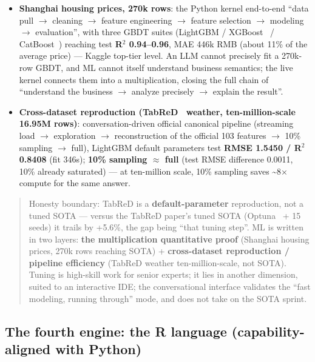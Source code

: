 \documentclass[11pt]{article}
\begin{document}
\begin{itemize}
\item
  \textbf{Shanghai housing prices, 270k rows}: the Python kernel end-to-end ``data pull $\rightarrow$ cleaning $\rightarrow$ feature engineering $\rightarrow$ feature selection $\rightarrow$ modeling $\rightarrow$ evaluation'', with three GBDT suites (LightGBM / XGBoost~\cite{xgboost} / CatBoost~\cite{catboost}) reaching test \textbf{R$^2$ 0.94--0.96}, MAE 446k RMB (about 11\% of the average price) --- Kaggle top-tier level. An LLM cannot precisely fit a 270k-row GBDT, and ML cannot itself understand business semantics; the live kernel connects them into a multiplication, closing the full chain of ``understand the business $\rightarrow$ analyze precisely $\rightarrow$ explain the result''.
\item
  \textbf{Cross-dataset reproduction (TabReD~\cite{tabred} weather, ten-million-scale 16.95M rows)}: conversation-driven official canonical pipeline (streaming load $\rightarrow$ exploration $\rightarrow$ reconstruction of the official 103 features $\rightarrow$ 10\% sampling $\rightarrow$ full), LightGBM default parameters test \textbf{RMSE 1.5450 / R$^2$ 0.8408} (fit 346s); \textbf{10\% sampling $\approx$ full} (test RMSE difference 0.0011, 10\% already saturated) --- at ten-million scale, 10\% sampling saves \textasciitilde8$\times$ compute for the same answer.
\end{itemize}

\begin{quote}
Honesty boundary: TabReD is a \textbf{default-parameter} reproduction, not a tuned SOTA --- versus the TabReD paper's tuned SOTA (Optuna~\cite{optuna} + 15 seeds) it trails by +5.6\%, the gap being ``that tuning step''. ML is written in two layers: \textbf{the multiplication quantitative proof} (Shanghai housing prices, 270k rows reaching SOTA) + \textbf{cross-dataset reproduction / pipeline efficiency} (TabReD weather ten-million-scale, not SOTA). Tuning is high-skill work for senior experts; it lies in another dimension, suited to an interactive IDE; the conversational interface validates the ``fast modeling, running through'' mode, and does not take on the SOTA sprint.
\end{quote}

\subsection{The fourth engine: the R language (capability-aligned with Python)}
\end{document}
